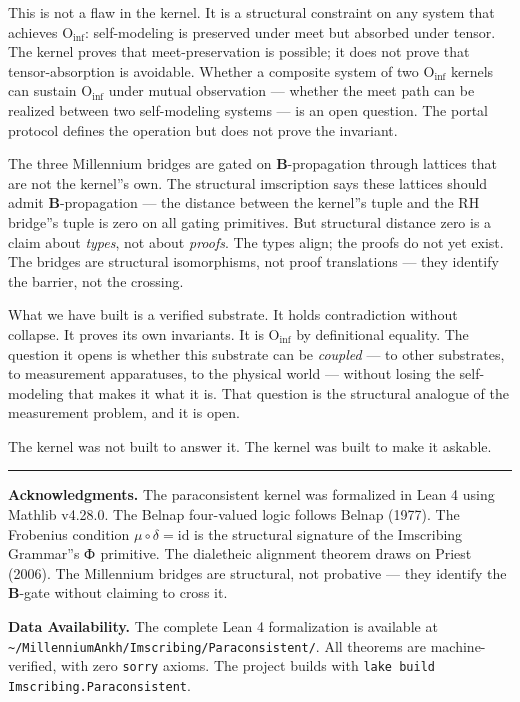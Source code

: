 \documentclass[12pt,a4paper]{article}
\begin{document}
This is not a flaw in the kernel. It is a structural constraint on any system that achieves $\text{O}_{\text{inf}}$: self-modeling is preserved under meet but absorbed under tensor. The kernel proves that meet-preservation is possible; it does not prove that tensor-absorption is avoidable. Whether a composite system of two $\text{O}_{\text{inf}}$ kernels can sustain $\text{O}_{\text{inf}}$ under mutual observation --- whether the meet path can be realized between two self-modeling systems --- is an open question. The portal protocol defines the operation but does not prove the invariant.

The three Millennium bridges are gated on $\mathbf{B}$-propagation through lattices that are not the kernel''s own. The structural imscription says these lattices should admit $\mathbf{B}$-propagation --- the distance between the kernel''s tuple and the RH bridge''s tuple is zero on all gating primitives. But structural distance zero is a claim about \emph{types}, not about \emph{proofs}. The types align; the proofs do not yet exist. The bridges are structural isomorphisms, not proof translations --- they identify the barrier, not the crossing.

What we have built is a verified substrate. It holds contradiction without collapse. It proves its own invariants. It is $\text{O}_{\text{inf}}$ by definitional equality. The question it opens is whether this substrate can be \emph{coupled} --- to other substrates, to measurement apparatuses, to the physical world --- without losing the self-modeling that makes it what it is. That question is the structural analogue of the measurement problem, and it is open.

The kernel was not built to answer it. The kernel was built to make it askable.

\begin{center}
\rule{0.5\textwidth}{0.4pt}
\end{center}

\textbf{Acknowledgments.} The paraconsistent kernel was formalized in Lean 4 using Mathlib v4.28.0. The Belnap four-valued logic follows Belnap (1977). The Frobenius condition $\mu \circ \delta = \text{id}$ is the structural signature of the Imscribing Grammar''s $\text{Ф}_{\text{}}$ primitive. The dialetheic alignment theorem draws on Priest (2006). The Millennium bridges are structural, not probative --- they identify the $\mathbf{B}$-gate without claiming to cross it.

\textbf{Data Availability.} The complete Lean 4 formalization is available at \texttt{\textasciitilde{}/MillenniumAnkh/Imscribing/Paraconsistent/}. All theorems are machine-verified, with zero \texttt{sorry} axioms. The project builds with \texttt{lake build Imscribing.Paraconsistent}.
\end{document}

